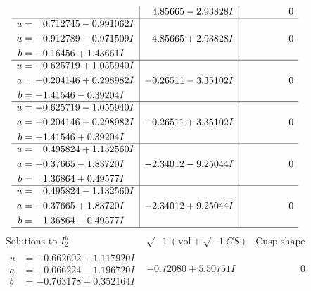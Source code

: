 \documentclass[1p]{elsarticle_modified}
\theoremstyle{definition}
\newcommand{\I}{\sqrt{-1}}
\begin{document}
$$\begin{array}{c|c|c}
 & \phantom{-}4.85665 - 2.93828 I & \phantom{-0.000000 } 0 \\ \hline\begin{aligned}
u &= \phantom{-}0.712745 - 0.991062 I \\
a &= -0.912789 - 0.971509 I \\
b &= -0.16456 + 1.43661 I\end{aligned}
 & \phantom{-}4.85665 + 2.93828 I & \phantom{-0.000000 } 0 \\ \hline\begin{aligned}
u &= -0.625719 + 1.055940 I \\
a &= -0.204146 + 0.298982 I \\
b &= -1.41546 - 0.39204 I\end{aligned}
 & -0.26511 - 3.35102 I & \phantom{-0.000000 } 0 \\ \hline\begin{aligned}
u &= -0.625719 - 1.055940 I \\
a &= -0.204146 - 0.298982 I \\
b &= -1.41546 + 0.39204 I\end{aligned}
 & -0.26511 + 3.35102 I & \phantom{-0.000000 } 0 \\ \hline\begin{aligned}
u &= \phantom{-}0.495824 + 1.132560 I \\
a &= -0.37665 - 1.83720 I \\
b &= \phantom{-}1.36864 + 0.49577 I\end{aligned}
 & -2.34012 - 9.25044 I & \phantom{-0.000000 } 0 \\ \hline\begin{aligned}
u &= \phantom{-}0.495824 - 1.132560 I \\
a &= -0.37665 + 1.83720 I \\
b &= \phantom{-}1.36864 - 0.49577 I\end{aligned}
 & -2.34012 + 9.25044 I & \phantom{-0.000000 } 0\\
 \hline 
 \end{array}$$\newpage$$\begin{array}{c|c|c}  
\text{Solutions to }I^u_{2}& \I (\text{vol} + \sqrt{-1}CS) & \text{Cusp shape}\\
 \hline 
\begin{aligned}
u &= -0.662602 + 1.117920 I \\
a &= -0.066224 - 1.196720 I \\
b &= -0.763178 + 0.352164 I\end{aligned}
 & -0.72080 + 5.50751 I & \phantom{-0.000000 } 0 \\ \hline\begin{aligned}

\end{aligned}
\end{array}$$
\end{document}
